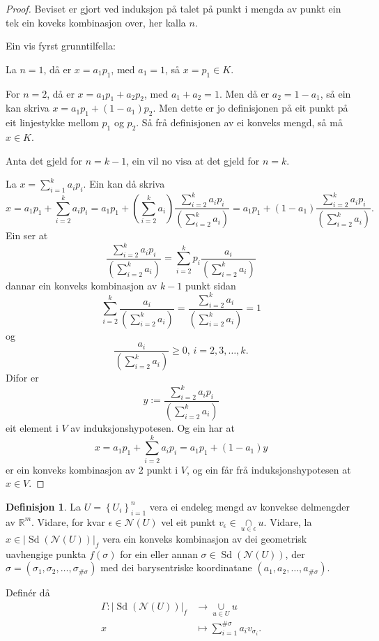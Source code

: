 \documentclass[a4paper, 12pt, norsk]{article}
\theoremstyle{plain}
\theoremstyle{definition}
\newtheorem{definition}[theorem]{Definisjon}
\newcommand{\Rb}{\mathbb{R}}
\newcommand{\Nc}{\mathcal{N}}
\newcommand{\intersect}{ \mathop{\cap}\limits }
\newcommand{\union}{ \mathop{\cup}\limits }
\newcommand{\gr}[1]{ \lvert #1 \rvert } %
\newcommand{\set}[1]{ \left\{ #1 \right\} } %
\newcommand{\tuple}[1]{ \left( #1 \right) } %
\DeclareMathOperator{\Sd}{Sd} %
\begin{document}
\begin{proof}
	Beviset er gjort ved induksjon på talet på punkt i mengda av punkt ein tek ein koveks kombinasjon over, her kalla \( n \).

	Ein vis fyrst grunntilfella:

	La \( n = 1 \), då er \( x = a_1 p_1 \), med \( a_1 = 1 \), så \( x = p_1 \in K \).
	
	For \( n = 2 \), då er \( x = a_1 p_1 + a_2 p_2 \), med \( a_1 + a_2 = 1 \). Men då er \( a_2 = 1 - a_1 \), så ein kan skriva \( x = a_1 p_1 + (1-a_1) p_2 \). Men dette er jo definisjonen på eit punkt på eit linjestykke mellom \( p_1 \) og \( p_2 \). Så frå definisjonen av ei konveks mengd, så må \( x \in K \).

	Anta det gjeld for \( n = k-1 \), ein vil no visa at det gjeld for \( n = k \).

	La \( x = \sum_{i=1}^k a_i p_i \). Ein kan då skriva
	\[ 
		x = a_1 p_1 + \sum_{i=2}^k a_i p_i = a_1 p_1 + (\sum_{i=2}^k a_i) \frac{\sum_{i=2}^k a_i p_i}{(\sum_{i=2}^k a_i)} = a_1 p_1 + (1-a_1) \frac{\sum_{i=2}^k a_i p_i}{(\sum_{i=2}^k a_i)}.
	\]
	Ein ser at
	\[
		\frac{\sum_{i=2}^k a_i p_i}{(\sum_{i=2}^k a_i)} = \sum_{i=2}^k p_i\frac{a_i}{(\sum_{i=2}^k a_i)}
	\]
	dannar ein konveks kombinasjon av \( k-1 \) punkt sidan
	\[
		\sum_{i=2}^k \frac{a_i}{(\sum_{i=2}^k a_i)} = \frac{\sum_{i=2}^k a_i}{(\sum_{i=2}^k a_i)} = 1
	\]
	og
	\[
		\frac{a_i}{(\sum_{i=2}^k a_i)} \geq 0, \, i=2,3,\dots,k.
	\]
	Difor er
	\[
		y := \frac{\sum_{i=2}^k a_i p_i}{(\sum_{i=2}^k a_i)}
	\]
	eit element i \( V \) av induksjonshypotesen. Og ein har at
	\[
		x = a_1 p_1 + \sum_{i=2}^k a_i p_i = a_1 p_1 + (1-a_1) y
	\]
	er ein konveks kombinasjon av \( 2 \) punkt i \( V \), og ein får frå induksjonshypotesen at \( x \in V \).
\end{proof}

\begin{definition} \label{thm:Gamma}
	La \( U = \set{U_i}_{i=1}^n \) vera ei endeleg mengd av konvekse delmengder av \( \Rb^m \). Vidare, for kvar \( \epsilon \in \Nc(U) \) vel eit punkt \( v_\epsilon \in \intersect_{u \in \epsilon} u \). Vidare, la \( x \in \gr{\Sd(\Nc(U))}_f \) vera ein konveks kombinasjon av dei geometrisk uavhengige punkta \( f(\sigma) \) for ein eller annan \( \sigma \in \Sd(\Nc(U)) \), der \( \sigma = \tuple{\sigma_1, \sigma_2, \dots, \sigma_{\#\sigma}} \) med dei barysentriske koordinatane \( \tuple{a_1, a_2, \dots, a_{\#\sigma}} \).
	
	Definér då
	\begin{align*}
		\Gamma : \gr{\Sd(\Nc(U))}_f &\to \union_{u \in U} u \\
		x &\mapsto \sum_{i=1}^{\#\sigma} a_i v_{\sigma_i}.
	\end{align*}
\end{definition}
\end{document}
